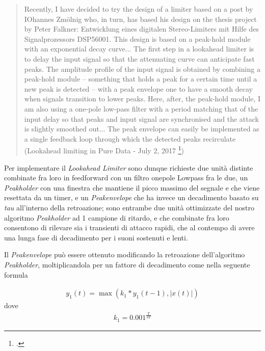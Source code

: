 \begin{quote}
    Recently, I have decided to try the design of a limiter based on a post by IOhannes Zmölnig who, 
    in turn, has based his design on the thesis project by Peter Falkner: 
    Entwicklung eines digitalen Stereo-Limiters mit Hilfe des Signalprozessors DSP56001.
    This design is based on a peak-hold module with an exponential decay curve...
    The first step in a lookahead limiter is to delay the input signal so 
    that the attenuating curve can anticipate fast peaks. 
    The amplitude profile of the input signal is obtained by combining a peak-hold module 
    – something that holds a peak for a certain time until a new peak is detected – 
    with a peak envelope one to have a smooth decay when signals transition to lower peaks. 
    Here, after, the peak-hold module, 
    I am also using a one-pole low-pass filter with a period matching that of the input delay 
    so that peaks and input signal are synchronised and the attack is slightly smoothed out... 
    The peak envelope can easily be implemented as a single feedback loop through which the detected peaks recirculate \\
    (Lookahead limiting in Pure Data - July 2, 2017
    \footcite{https://www.dariosanfilippo.com/blog/2017/lookahead-limiting-in-pure-data/})
\end{quote}

Per implementare il \textit{Lookahead Limiter} 
sono dunque richieste due unità distinte
combinate fra loro in feedforward con un filtro onepole Lowpass fra le due,
un \textit{Peakholder} con una finestra che mantiene il picco massimo del segnale e
che viene resettata da un timer, 
e un \textit{Peakenvelope} che ha invece un decadimento 
basato su \textit{tau} all'interno della retroazione; sono entrambe due
unità ottimizzate del nostro algoritmo \textit{Peakholder} ad 1 campione di ritardo,
e che combinate fra loro consentono di rilevare sia i transienti di attacco rapidi, 
che al contempo di avere una lunga fase di decadimento per i suoni sostenuti e lenti.

Il \textit{Peakenvelope} può essere ottenuto modificando 
la retroazione dell'algoritmo \textit{Peakholder}, moltiplicandola per 
un fattore di decadimento come nella seguente formula 

\begin{align*}
    y_{1}(t) = \max\left( k_{1} * y_{1}(t\!-\!1), \left\lvert{x(t)}\right\rvert \right)
\end{align*}
dove 
\begin{align*}
    k_{1} = {0.001}^{\frac{T}{ST}} 
\end{align*} 

